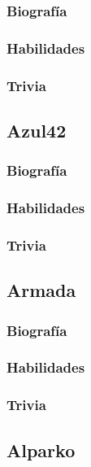 \documentclass[letterpaper]{article}
\begin{document}
\subsubsection{Biografía}

\subsubsection{Habilidades}

\subsubsection{Trivia}
\subsection{Azul42}

\subsubsection{Biografía}

\subsubsection{Habilidades}

\subsubsection{Trivia}

\subsection{Armada}

\subsubsection{Biografía}

\subsubsection{Habilidades}

\subsubsection{Trivia}

\subsection{Alparko}
\end{document}
